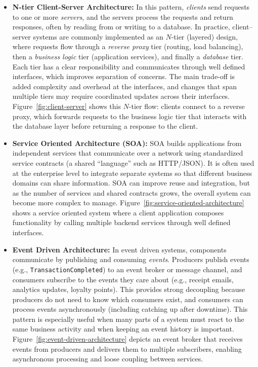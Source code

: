 \begin{itemize}
    \item \textbf{N-tier Client-Server Architecture:} In this pattern, \emph{clients} send requests to one or more \emph{servers}, and the servers process the requests and return responses, often by reading from or writing to a database. In practice, client--server systems are commonly implemented as an $N$-tier (layered) design, where requests flow through a \emph{reverse proxy} tier (routing, load balancing), then a \emph{business logic} tier (application services), and finally a \emph{database} tier. Each tier has a clear responsibility and communicates through well defined interfaces, which improves separation of concerns. The main trade-off is added complexity and overhead at the interfaces, and changes that span multiple tiers may require coordinated updates across their interfaces. Figure~\ref{fig:client-server} shows this $N$-tier flow: clients connect to a reverse proxy, which forwards requests to the business logic tier that interacts with the database layer before returning a response to the client.
    
    

    \item \textbf{Service Oriented Architecture (SOA):} SOA builds applications from independent services that communicate over a network using standardized service contracts (a shared “language” such as HTTP/JSON). It is often used at the enterprise level to integrate separate systems so that different business domains can share information. SOA can improve reuse and integration, but as the number of services and shared contracts grows, the overall system can become more complex to manage. Figure~\ref{fig:service-oriented-architecture} shows a service oriented system where a client application composes functionality by calling multiple backend services through well defined interfaces.
    
    

    \item \textbf{Event Driven Architecture:} In event driven systems, components communicate by publishing and consuming \emph{events}. Producers publish events (e.g., \texttt{TransactionCompleted}) to an event broker or message channel, and consumers subscribe to the events they care about (e.g., receipt emails, analytics updates, loyalty points). This provides strong decoupling because producers do not need to know which consumers exist, and consumers can process events asynchronously (including catching up after downtime). This pattern is especially useful when many parts of a system must react to the same business activity and when keeping an event history is important. Figure~\ref{fig:event-driven-architecture} depicts an event broker that receives events from producers and delivers them to multiple subscribers, enabling asynchronous processing and loose coupling between services.
    

\end{itemize}
